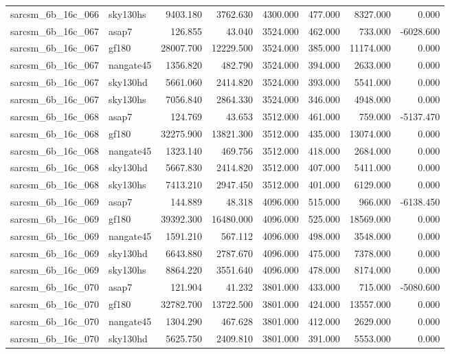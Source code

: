 \begin{tabular}{llrrrrrr}
sarcsm\_6b\_16c\_066 & sky130hs & 9403.180 & 3762.630 & 4300.000 & 477.000 & 8327.000 & 0.000 \\
sarcsm\_6b\_16c\_067 & asap7 & 126.855 & 43.040 & 3524.000 & 462.000 & 733.000 & -6028.600 \\
sarcsm\_6b\_16c\_067 & gf180 & 28007.700 & 12229.500 & 3524.000 & 385.000 & 11174.000 & 0.000 \\
sarcsm\_6b\_16c\_067 & nangate45 & 1356.820 & 482.790 & 3524.000 & 394.000 & 2633.000 & 0.000 \\
sarcsm\_6b\_16c\_067 & sky130hd & 5661.060 & 2414.820 & 3524.000 & 393.000 & 5541.000 & 0.000 \\
sarcsm\_6b\_16c\_067 & sky130hs & 7056.840 & 2864.330 & 3524.000 & 346.000 & 4948.000 & 0.000 \\
sarcsm\_6b\_16c\_068 & asap7 & 124.769 & 43.653 & 3512.000 & 461.000 & 759.000 & -5137.470 \\
sarcsm\_6b\_16c\_068 & gf180 & 32275.900 & 13821.300 & 3512.000 & 435.000 & 13074.000 & 0.000 \\
sarcsm\_6b\_16c\_068 & nangate45 & 1323.140 & 469.756 & 3512.000 & 418.000 & 2684.000 & 0.000 \\
sarcsm\_6b\_16c\_068 & sky130hd & 5667.830 & 2414.820 & 3512.000 & 407.000 & 5411.000 & 0.000 \\
sarcsm\_6b\_16c\_068 & sky130hs & 7413.210 & 2947.450 & 3512.000 & 401.000 & 6129.000 & 0.000 \\
sarcsm\_6b\_16c\_069 & asap7 & 144.889 & 48.318 & 4096.000 & 515.000 & 966.000 & -6138.450 \\
sarcsm\_6b\_16c\_069 & gf180 & 39392.300 & 16480.000 & 4096.000 & 525.000 & 18569.000 & 0.000 \\
sarcsm\_6b\_16c\_069 & nangate45 & 1591.210 & 567.112 & 4096.000 & 498.000 & 3548.000 & 0.000 \\
sarcsm\_6b\_16c\_069 & sky130hd & 6643.880 & 2787.670 & 4096.000 & 475.000 & 7378.000 & 0.000 \\
sarcsm\_6b\_16c\_069 & sky130hs & 8864.220 & 3551.640 & 4096.000 & 478.000 & 8174.000 & 0.000 \\
sarcsm\_6b\_16c\_070 & asap7 & 121.904 & 41.232 & 3801.000 & 433.000 & 715.000 & -5080.600 \\
sarcsm\_6b\_16c\_070 & gf180 & 32782.700 & 13722.500 & 3801.000 & 424.000 & 13557.000 & 0.000 \\
sarcsm\_6b\_16c\_070 & nangate45 & 1304.290 & 467.628 & 3801.000 & 412.000 & 2629.000 & 0.000 \\
sarcsm\_6b\_16c\_070 & sky130hd & 5625.750 & 2409.810 & 3801.000 & 391.000 & 5553.000 & 0.000 \\

\end{tabular}
